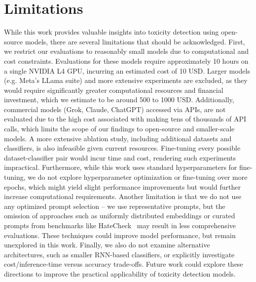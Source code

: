 \section{Limitations}

While this work provides valuable insights into toxicity detection using open-source models, there are several limitations that should be acknowledged. First, we restrict our evaluations to reasonably small models due to computational and cost constraints. Evaluations for these models require approximately 10 hours on a single NVIDIA L4 GPU, incurring an estimated cost of 10 USD. Larger models (e.g. Meta's LLama suite) and more extensive experiments are excluded, as they would require significantly greater computational resources and financial investment, which we estimate to be around 500 to 1000 USD. Additionally, commercial models (Grok, Claude, ChatGPT) accessed via APIs, are not evaluated due to the high cost associated with making tens of thousands of API calls, which limits the scope of our findings to open-source and smaller-scale models.\newline
A more extensive ablation study, including additional datasets and classifiers, is also infeasible given current resources. Fine-tuning every possible dataset-classifier pair would incur time and cost, rendering such experiments impractical. Furthermore, while this work uses standard hyperparameters for fine-tuning, we do not explore hyperparameter optimization or fine-tuning over more epochs, which might yield slight performance improvements but would further increase computational requirements.\newline
Another limitation is that we do not use any optimized prompt selection -- we use representative prompts, but the omission of approaches such as uniformly distributed embeddings or curated prompts from benchmarks like HateCheck~\cite{Hatecheck} may result in less comprehensive evaluations. These techniques could improve model performance, but remain unexplored in this work.\newline
Finally, we also do not examine alternative architectures, such as smaller RNN-based classifiers, or explicitly investigate cost/inference-time versus accuracy trade-offs. Future work could explore these directions to improve the practical applicability of toxicity detection models.